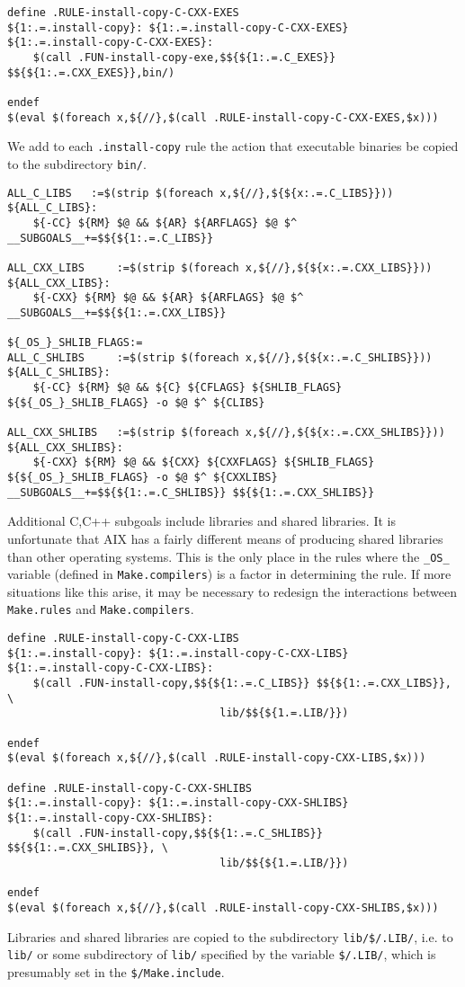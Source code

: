 \documentclass[letterpaper]{article}
\begin{document}
\begin{verbatim}
define .RULE-install-copy-C-CXX-EXES
${1:.=.install-copy}: ${1:.=.install-copy-C-CXX-EXES}
${1:.=.install-copy-C-CXX-EXES}:
	$(call .FUN-install-copy-exe,$${${1:.=.C_EXES}} $${${1:.=.CXX_EXES}},bin/)

endef
$(eval $(foreach x,${//},$(call .RULE-install-copy-C-CXX-EXES,$x)))
\end{verbatim}
We add to each \verb+.install-copy+ rule the action that executable
binaries be copied to the subdirectory \verb+bin/+.

\begin{verbatim}
ALL_C_LIBS   :=$(strip $(foreach x,${//},${${x:.=.C_LIBS}}))
${ALL_C_LIBS}:
	${-CC} ${RM} $@ && ${AR} ${ARFLAGS} $@ $^
__SUBGOALS__+=$${${1:.=.C_LIBS}}

ALL_CXX_LIBS     :=$(strip $(foreach x,${//},${${x:.=.CXX_LIBS}}))
${ALL_CXX_LIBS}:
	${-CXX} ${RM} $@ && ${AR} ${ARFLAGS} $@ $^
__SUBGOALS__+=$${${1:.=.CXX_LIBS}}

${_OS_}_SHLIB_FLAGS:=
ALL_C_SHLIBS     :=$(strip $(foreach x,${//},${${x:.=.C_SHLIBS}}))
${ALL_C_SHLIBS}:
	${-CC} ${RM} $@ && ${C} ${CFLAGS} ${SHLIB_FLAGS} ${${_OS_}_SHLIB_FLAGS} -o $@ $^ ${CLIBS}

ALL_CXX_SHLIBS   :=$(strip $(foreach x,${//},${${x:.=.CXX_SHLIBS}}))
${ALL_CXX_SHLIBS}:
	${-CXX} ${RM} $@ && ${CXX} ${CXXFLAGS} ${SHLIB_FLAGS} ${${_OS_}_SHLIB_FLAGS} -o $@ $^ ${CXXLIBS}
__SUBGOALS__+=$${${1:.=.C_SHLIBS}} $${${1:.=.CXX_SHLIBS}}
\end{verbatim}
Additional C,C++ subgoals include libraries and shared libraries.  It is
unfortunate that AIX has a fairly different means of producing shared
libraries than other operating systems.  This is the only place in the
rules where the \verb+_OS_+ variable (defined in \verb+Make.compilers+)
is a factor in determining the rule.  If more situations
like this arise, it may be necessary to redesign the interactions
between \verb+Make.rules+ and \verb+Make.compilers+.

\begin{verbatim}
define .RULE-install-copy-C-CXX-LIBS
${1:.=.install-copy}: ${1:.=.install-copy-C-CXX-LIBS}
${1:.=.install-copy-C-CXX-LIBS}:
	$(call .FUN-install-copy,$${${1:.=.C_LIBS}} $${${1:.=.CXX_LIBS}}, \
                                 lib/$${${1.=.LIB/}})

endef
$(eval $(foreach x,${//},$(call .RULE-install-copy-CXX-LIBS,$x)))

define .RULE-install-copy-C-CXX-SHLIBS
${1:.=.install-copy}: ${1:.=.install-copy-CXX-SHLIBS}
${1:.=.install-copy-CXX-SHLIBS}:
	$(call .FUN-install-copy,$${${1:.=.C_SHLIBS}} $${${1:.=.CXX_SHLIBS}}, \
                                 lib/$${${1.=.LIB/}})

endef
$(eval $(foreach x,${//},$(call .RULE-install-copy-CXX-SHLIBS,$x)))
\end{verbatim}
Libraries and shared libraries are copied to the subdirectory
\verb+lib/$/.LIB/+, i.e. to \verb+lib/+ or some subdirectory of
\verb+lib/+ specified by the  variable \verb+$/.LIB/+, which is
presumably set in the \verb+$/Make.include+.
\end{document}

